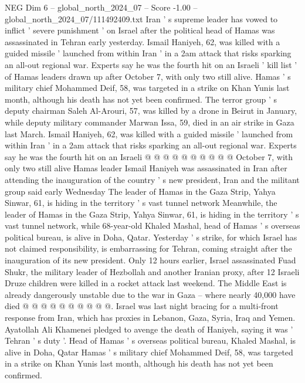 \begin{textsample}{NEG Dim 6 – global\_north\_2024\_07 – Score -1.00 – global\_north\_2024\_07/111492409.txt}  \label{ex:f6_neg_224}
Iran ' s supreme leader has vowed to inflict ' severe punishment ' on Israel after the political head of Hamas was assassinated in Tehran early yesterday.
Ismail Haniyeh, 62, was killed with a guided missile ' launched from within Iran ' in a 2am attack that risks sparking an all-out regional war.
Experts say he was the fourth hit on an Israeli ' kill list ' of Hamas leaders drawn up after October 7, with only two still alive.
Hamas ' s military chief Mohammed Deif, 58, was targeted in a strike on Khan Yunis last month, although his death has not yet been confirmed.
The terror group ' s deputy chairman Saleh Al-Arouri, 57, was killed by a drone in Beirut in January, while deputy military commander Marwan Issa, 59, died in an air strike in Gaza last March.
Ismail Haniyeh, 62, was killed with a guided missile ' launched from within Iran ' in a 2am attack that risks sparking an all-out regional war.
Experts say he was the fourth hit on an Israeli @ @ @ @ @ @ @ @ @ @ October 7, with only two still alive Hamas leader Ismail Haniyeh was assassinated in Iran after attending the inauguration of the country ' s new president, Iran and the militant group said early Wednesday The leader of Hamas in the Gaza Strip, Yahya Sinwar, 61, is hiding in the territory ' s vast tunnel network Meanwhile, the leader of Hamas in the Gaza Strip, Yahya Sinwar, 61, is hiding in the territory ' s vast tunnel network, while 68-year-old Khaled Mashal, head of Hamas ' s overseas political bureau, is alive in Doha, Qatar.
Yesterday ' s strike, for which Israel has not claimed responsibility, is embarrassing for Tehran, coming straight after the inauguration of its new president.
Only 12 hours earlier, Israel assassinated Fuad Shukr, the military leader of Hezbollah and another Iranian proxy, after 12 Israeli Druze children were killed in a rocket attack last weekend.
The Middle East is already dangerously unstable due to the war in Gaza -- where nearly 40,000 have died @ @ @ @ @ @ @ @ @ @.
Israel was last night bracing for a multi-front response from Iran, which has proxies in Lebanon, Gaza, Syria, Iraq and Yemen.
Ayatollah Ali Khamenei pledged to avenge the death of Haniyeh, saying it was ' Tehran ' s duty '.
Head of Hamas ' s overseas political bureau, Khaled Mashal, is alive in Doha, Qatar Hamas ' s military chief Mohammed Deif, 58, was targeted in a strike on Khan Yunis last month, although his death has not yet been confirmed.

\end{textsample}
